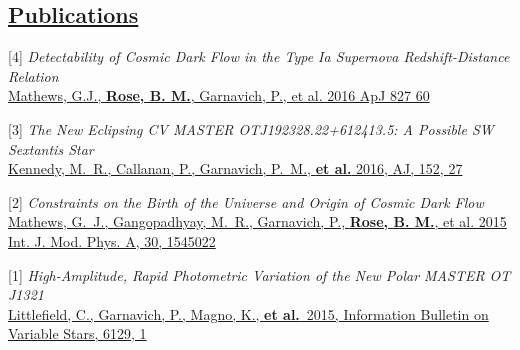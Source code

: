 \documentclass[margin]{res}
\begin{document}
\begin{resume}




\section{\href{https://ui.adsabs.harvard.edu/#search/q=orcid\%3A\%220000-0002-1873-8973\%22&sort=date\%20desc\%2C\%20bibcode\%20desc}{Publications}}


\hangindent=15pt [4] {\sl Detectability of Cosmic Dark Flow in the Type Ia Supernova Redshift-Distance Relation}\\
\href{https://ui.adsabs.harvard.edu/#abs/2016ApJ...827...60M/abstract}{Mathews, G.J., {\bf Rose, B. M.}, Garnavich, P., et al. 2016 ApJ 827 60}

\hangindent=15pt [3] {\sl The New Eclipsing CV MASTER OTJ192328.22+612413.5: A Possible SW Sextantis Star}\\
\href{https://ui.adsabs.harvard.edu/#abs/2016AJ....152...27K/abstract}{Kennedy, M.~R., Callanan, P., Garnavich, P.~M., {\bf et al.} 2016, AJ, 152, 27}

\hangindent=15pt [2] {\sl Constraints on the Birth of the Universe and Origin of Cosmic Dark Flow}\\
\href{https://ui.adsabs.harvard.edu/#abs/2015IJMPA..3045022M/abstract}{Mathews, G.~J., Gangopadhyay, M.~R., Garnavich, P., {\bf Rose, B. M.}, et al. 2015 Int. J. Mod. Phys. A, 30, 1545022}

\hangindent=15pt [1] {\sl High-Amplitude, Rapid Photometric Variation of the New Polar MASTER OT J1321}\\
\href{https://ui.adsabs.harvard.edu/#abs/2015IBVS.6129....1L/abstract}{Littlefield, C., Garnavich, P., Magno, K., {\bf et al.}\ 2015, Information Bulletin on Variable Stars, 6129, 1}

% 
% 




\end{resume}
\end{document}
